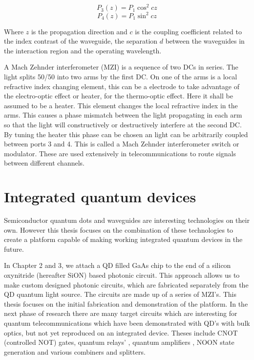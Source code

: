 \begin{equation} P_3(z) = P_1 \cos^2 cz \end{equation} \begin{equation} P_4(z) =
P_1 \sin^2 cz \end{equation}

Where $z$ is the propagation direction and $c$ is the coupling coefficient
related to the index contrast of the waveguide, the separation $d$ between the
waveguides in the interaction region and the operating wavelength.

A Mach Zehnder interferometer (MZI) is a sequence of two DCs in series. The
light splits 50/50 into two arms by the first DC. On one of the arms is a local
refractive index changing element, this can be a electrode to take advantage of
the electro-optic effect or heater, for the thermo-optic effect. Here it shall
be assumed to be a heater. This element changes the local refractive index in
the arms. This causes a phase mismatch between the light propagating in each arm
so that the light will constructively or destructively interfere at the second
DC. By tuning the heater this phase can be chosen an light can be arbitrarily
coupled between ports 3 and 4. This is called a Mach Zehnder interferometer
switch or modulator. These are used extensively in telecommunications to route
signals between different channels.

 \section{Integrated quantum devices}

Semiconductor quantum dots and waveguides are interesting technologies on their
own. However this thesis focuses on the combination of these technologies to
create a platform capable of making working integrated quantum devices in the
future.

In Chapter 2 and 3, we attach a QD
filled GaAs chip to the end of a silicon oxynitride (hereafter SiON) based photonic circuit. This approach
allows us to make custom designed photonic circuits, which are fabricated
separately from the QD quantum light source. The circuits are made up of a
series of MZI's. This thesis focuses on the initial fabrication and
demonstration of the platform. In the next phase of research there are many
target circuits which are interesting for quantum telecommunications which have
been demonstrated with QD's with bulk optics, but not yet reproduced on an
integrated device. Theses include CNOT (controlled NOT) gates\cite{pooley2012controlled}, quantum relays'
\cite{varnava2015entangled}, quantum amplifiers \cite{kocsis2013heralded,
zavatta2011high}, NOON state generation \cite{bennett2015cavity, afek2010high, giovannetti2011advances} and various
combiners and splitters.

